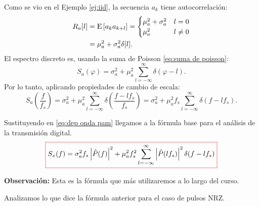 Como se vio en el Ejemplo \ref{ej:iid}, la secuencia $a_k$ tiene autocorrelación:
\begin{align*}
R_a[l] &= \mathrm{E}\left[a_k a_{k+l}\right]= \begin{cases}
                                        \mu_a^2+\sigma_a^2 & l = 0\\
                                        \mu_a^2 & l\neq 0
                                       \end{cases} \\
                                       &= \mu_a^2+\sigma_a^2\delta[l].
\end{align*}
El espectro discreto es, usando la suma de Poisson \eqref{eq:suma de poisson}:
\begin{equation*}
  S_a(\varphi) = \sigma_a^2 + \mu_a^2 \sum_{l=-\infty}^{\infty}\delta(\varphi - l).
\end{equation*}
Por lo tanto, aplicando propiedades de cambio de escala:
\begin{equation*}
S_a\left(\frac{f}{f_s}\right) = \sigma_a^2+\mu_a^2\sum_{l=-\infty}^{\infty} \delta\left(\frac{f-lf_s}{f_s}\right) = \sigma_a^2+\mu_a^2 f_s \sum_{l=-\infty}^{\infty} \delta (f-lf_s).    
\end{equation*}

Sustituyendo en \eqref{eq:dep onda pam} llegamos a la fórmula base para el análisis de la transmisión digital.
\begin{equation}\label{eq:dep onda pam iid}
    {\color{Red}\boxed{\normalcolor S_x(f) = \sigma_a^2 f_s \left|\hat{P}(f)\right|^2 + \mu_a^2 f_s^2 \sum_{l=-\infty}^{\infty} \left|\hat{P}(lf_s)\right|^2\delta(f-lf_s)}}
\end{equation} 

\textbf{Observación:} Esta es la fórmula que más utilizaremos a lo largo del curso.

Analizamos lo que dice la fórmula anterior para el caso de pulsos NRZ.

